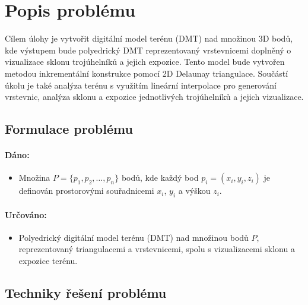 \section{Popis problému}

Cílem úlohy je vytvořit digitální model terénu (DMT) nad množinou 3D bodů, kde výstupem bude polyedrický DMT reprezentovaný vrstevnicemi doplněný o vizualizace sklonu trojúhelníků a jejich expozice. Tento model bude vytvořen metodou inkrementální konstrukce pomocí 2D Delaunay triangulace. Součástí úkolu je také analýza terénu s využitím lineární interpolace pro generování vrstevnic, analýza sklonu a expozice jednotlivých trojúhelníků a jejich vizualizace.

\subsection{Formulace problému}

\paragraph{Dáno:}
\begin{itemize}
    \item Množina \( P = \{ p_1, p_2, \dots, p_n \} \) bodů, kde každý bod \( p_i = (x_i, y_i, z_i) \) je definován prostorovými souřadnicemi \( x_i \), \( y_i \) a výškou \( z_i \).
\end{itemize}

\paragraph{Určováno:}
\begin{itemize}
    \item Polyedrický digitální model terénu (DMT) nad množinou bodů \( P \), reprezentovaný triangulacemi a vrstevnicemi, spolu s vizualizacemi sklonu a expozice terénu.
\end{itemize}

\subsection{Techniky řešení problému}

